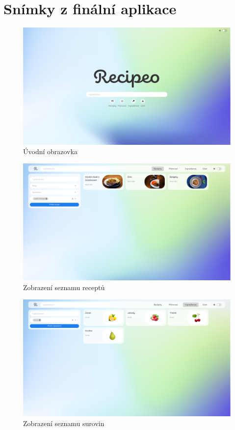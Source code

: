\chapter{Snímky z finální aplikace}

\begin{figure}[H]
    \includegraphics[width=\textwidth]{images/final-look/uvodni-obrazovka}
    \caption{Úvodní obrazovka} \label{picture:recipeo:uvodni-obrazovka}
\end{figure}

\vspace*{\fill}
\begin{figure}[H]
    \includegraphics[width=\textwidth]{images/final-look/recepty}
    \caption{Zobrazení seznamu receptů} \label{picture:recipeo:recepty}
\end{figure}

\begin{figure}[H]
    \includegraphics[width=\textwidth]{images/final-look/suroviny}
    \caption{Zobrazení seznamu surovin} \label{picture:recipeo:suroviny}
\end{figure}
\vspace*{\fill}

